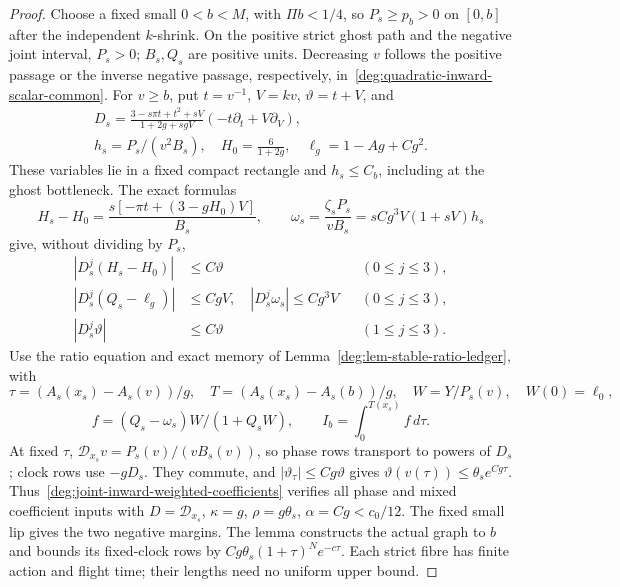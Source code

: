 \begin{proof}
Choose a fixed small \(0<b<M\), with \(\Pi b<1/4\), so
\(P_s\ge p_b>0\) on \([0,b]\) after the independent \(k\)-shrink.
On the positive strict ghost path and the negative joint interval,
\(P_s>0\); \(B_s,Q_s\) are positive units. Decreasing \(v\)
follows the positive passage or the inverse negative passage,
respectively, in~\eqref{deg:quadratic-inward-scalar-common}.
For \(v\ge b\), put \(t=v^{-1}\), \(V=kv\), \(\vartheta=t+V\), and
\[
 \begin{gathered}
 D_s=\frac{3-s\pi t+t^2+sV}{1+2g+sgV}
                  (-t\partial_t+V\partial_V),\\
 h_s=P_s/(v^2B_s),\quad H_0=\frac6{1+2g},\quad\ell_g=1-Ag+Cg^2.
 \end{gathered}
\]
These variables lie in a fixed compact rectangle and \(h_s\le C_b\),
including at the ghost bottleneck. The exact formulas
\[
 H_s-H_0=\frac{s[-\pi t+(3-gH_0)V]}{B_s},\qquad
 \omega_s=\frac{\zeta_sP_s}{vB_s}
                 =sCg^3V(1+sV)h_s
\]
give, without dividing by \(P_s\),
\begin{equation}\label{deg:joint-inward-weighted-coefficients}
 \begin{aligned}
 |D_s^j(H_s-H_0)|&\le C\vartheta &&(0\le j\le3),\\
 |D_s^j(Q_s-\ell_g)|&\le CgV,\quad
 |D_s^j\omega_s|\le Cg^3V &&(0\le j\le3),\\
 |D_s^j\vartheta|&\le C\vartheta &&(1\le j\le3).
 \end{aligned}
\end{equation}
Use the ratio equation and exact memory of
Lemma~\ref{deg:lem-stable-ratio-ledger}, with
\[
 \tau=(A_s(x_s)-A_s(v))/g,\quad
 T=(A_s(x_s)-A_s(b))/g,\quad W=Y/P_s(v),\quad W(0)=\ell_0,
\]
\[
 f=(Q_s-\omega_s)W/(1+Q_sW),\qquad
 I_b=\int_0^{T(x_s)}f\,d\tau .
\]
At fixed \(\tau\), \(\mathcal D_{x_s}v=P_s(v)/(vB_s(v))\), so
phase rows transport to powers of \(D_s\); clock rows use \(-gD_s\).
They commute, and \(|\vartheta_\tau|\le Cg\vartheta\) gives
\(\vartheta(v(\tau))\le\theta_s e^{Cg\tau}\).
Thus~\eqref{deg:joint-inward-weighted-coefficients} verifies all
phase and mixed coefficient inputs with
\(D=\mathcal D_{x_s}\), \(\kappa=g\), \(\rho=g\theta_s\),
\(\alpha=Cg<c_0/12\). The fixed small lip gives the two negative
margins. The lemma constructs the actual graph to \(b\) and bounds
its fixed-clock rows by \(Cg\theta_s(1+\tau)^Ne^{-c\tau}\).
Each strict fibre has finite action and flight time; their lengths
need no uniform upper bound.


\end{proof}
